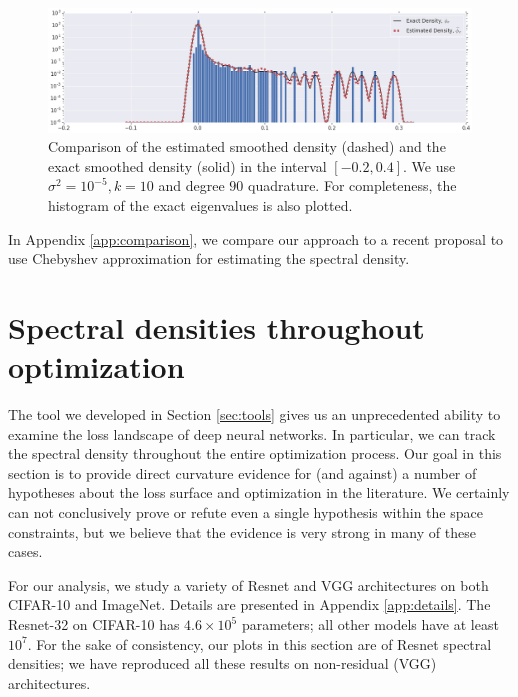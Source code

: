 \documentclass{article}
\begin{document}
\begin{figure}[h]
\includegraphics[width=\textwidth]{verification.png}
\vspace{-0.5cm}
\caption{Comparison of the estimated smoothed density (dashed) and the exact smoothed density (solid) in the interval $[-0.2, 0.4]$. We use $\sigma^2 = 10^{-5}, k=10$ and degree $90$ quadrature. For completeness, the histogram of the exact eigenvalues is also plotted. \label{fig:verification}}
\end{figure}

In Appendix \ref{app:comparison}, we compare our approach to a recent proposal \cite{adams2018estimating} to use Chebyshev approximation for estimating the spectral density.

\section{Spectral densities throughout optimization} \label{sec:experiments}

The tool we developed in Section \ref{sec:tools} gives us an unprecedented ability to examine the loss landscape of deep neural networks. In particular, we can track the spectral density throughout the entire optimization process. Our goal in this section is to provide direct curvature evidence for (and against) a number of hypotheses about the loss surface and optimization in the literature. We certainly can not conclusively prove or refute even a single hypothesis within the space constraints, but we believe that the evidence is very strong in many of these cases.

For our analysis, we study a variety of Resnet and VGG \cite{simonyan2014very} architectures on both CIFAR-10 and ImageNet. Details are presented in Appendix \ref{app:details}. The Resnet-32 on CIFAR-10 has $4.6 \times 10^5$ parameters; all other models have at least $10^7$. For the sake of consistency, our plots in this section are of Resnet spectral densities; we have reproduced all these results on non-residual (VGG) architectures.
\end{document}
